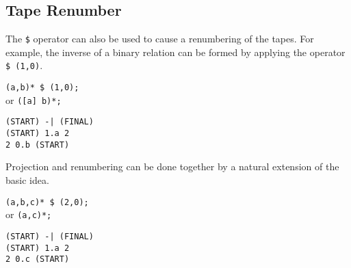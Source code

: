 \subsection{Tape Renumber}
The \verb#$# operator can also be used to cause a renumbering of the tapes.
For example, the inverse of a binary relation can be formed by applying the
operator \verb#$ (1,0)#.
\begin{center}\begin{minipage}[t]{3in}\begin{minipage}[t]{3in}\begin{tabbing}
\qquad \= \verb#(a,b)* $ (1,0);#\\
or \> \verb#([a] b)*;#
\end{tabbing}\end{minipage}\end{minipage}
\begin{minipage}[t]{1.6in}\begin{verbatim}
(START) -| (FINAL)
(START) 1.a 2
2 0.b (START)
\end{verbatim}\end{minipage}\end{center}
Projection and renumbering can be done together by a natural extension of
the basic idea.
\begin{center}\begin{minipage}[t]{3in}\begin{minipage}[t]{3in}\begin{tabbing}
\qquad \= \verb#(a,b,c)* $ (2,0);#\\
or \> \verb#(a,c)*;#
\end{tabbing}\end{minipage}\end{minipage}
\begin{minipage}[t]{1.6in}\begin{verbatim}
(START) -| (FINAL)
(START) 1.a 2
2 0.c (START)
\end{verbatim}\end{minipage}\end{center}

